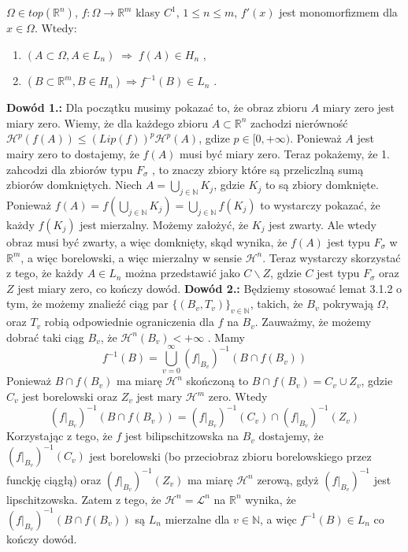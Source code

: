 \begin{tw}
	$\Omega \in top(\mathbb{R}^n)$, $f: \Omega \rightarrow \mathbb{R}^m$ klasy $C^1$, $1 \leq n \leq m$, $f'(x)$ jest monomorfizmem dla $x \in \Omega$. Wtedy:
	\begin{enumerate}	
		\item $(A \subset \Omega, A \in L_n) \; \Longrightarrow \; f(A) \in H_n$ ,
		\item $(B \subset \mathbb{R}^m, B \in H_n) \Longrightarrow f^{-1}(B) \in L_n$ .
	\end{enumerate}

	\textbf{Dowód 1.:}\newline
		Dla początku musimy pokazać to, że obraz zbioru $A$ miary zero jest miary zero. Wiemy, że dla każdego zbioru $A \subset \mathbb{R}^n$ zachodzi nierówność $\mathcal{H}^p(f(A)) \leq (Lip(f))^p \mathcal{H}^p(A)$, gdize $p \in [0, +\infty)$. Ponieważ $A$ jest mairy zero to dostajemy, że $f(A)$ musi być miary zero. 
		Teraz pokażemy, że 1. zahcodzi dla zbiorów typu $F_{\sigma}$ , to znaczy zbiory które są przeliczlną sumą zbiorów domkniętych. Niech $A = \bigcup_{j \in \mathbb{N}} K_j$, gdzie $K_j$ to są zbiory domknięte. Ponieważ $f(A) = f(\bigcup_{j \in \mathbb{N}} K_j) = \bigcup_{j \in \mathbb{N}} f(K_j)$ to wystarczy pokazać, że każdy $f(K_j)$ jest mierzalny. Możemy założyć, że $K_j$ jest zwarty. Ale wtedy obraz musi być zwarty, a więc domknięty, skąd wynika, że $f(A)$ jest typu $F_{\sigma}$ w $\mathbb{R}^m$, a więc borelowski, a więc mierzalny w sensie $\mathcal{H}^n$. 
		Teraz wystarczy skorzystać z tego, że każdy $A \in L_n$ można przedstawić jako $C \backslash Z$, gdzie $C$ jest typu $F_{\sigma}$ oraz $Z$ jest miary zero, co kończy dowód.
	\newline
	\textbf{Dowód 2.:}\newline
		Będziemy stosować lemat 3.1.2 o tym, że możemy znalieźć ciąg par $\{(B_v, T_v)\}_{v \in \mathbb{N}}$, takich, że $B_v$ pokrywają $\Omega$, oraz $T_v$ robią odpowiednie ograniczenia dla $f$ na $B_v$. Zauważmy, że możemy dobrać taki ciąg $B_v$, że $\mathcal{H}^n(B_v) < + \infty$ . Mamy $$ 
			f^{-1}(B) = \bigcup_{v=0}^{\infty} (f|_{B_v})^{-1} (B \cap f(B_v))
		$$
		Ponieważ $B \cap f(B_v)$ ma miarę $\mathcal{H}^n$ skończoną to $B \cap f(B_v) = C_v \cup Z_v$, gdzie $C_v$ jest borelowski oraz $Z_v$ jest mary $\mathcal{H}^m$ zero. Wtedy $$ 
			(f|_{B_v})^{-1}(B \cap f(B_v)) = (f|_{B_v})^{-1}(C_v) \cap (f|_{B_v})^{-1}(Z_v)
		$$
		Korzystając z tego, że $f$ jest bilipschitzowska na $B_v$ dostajemy, że $(f|_{B_v})^{-1}(C_v)$ jest borelowski (bo przeciobraz zbioru borelowskiego przez funckję ciągłą) oraz $(f|_{B_v})^{-1}(Z_v)$ ma miarę $\mathcal{H}^n$ zerową, gdyż $(f|_{B_v})^{-1}$ jest lipschitzowska. Zatem z tego, że $\mathcal{H}^n = \mathcal{L}^n$ na $\mathbb{R}^n$ wynika, że $(f|_{B_v})^{-1}(B \cap f(B_v))$ są $L_n$ mierzalne dla $v \in \mathbb{N}$, a więc $f^{-1}(B) \in L_n$ co kończy dowód. 
\end{tw}